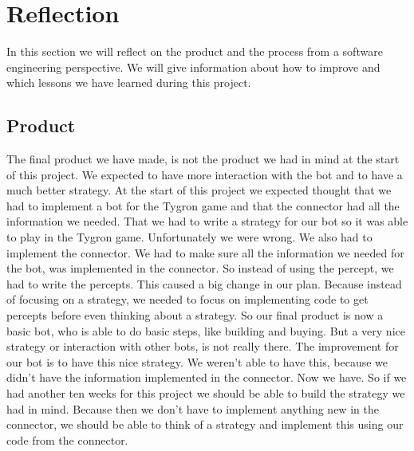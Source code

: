 \section{Reflection}
In this section we will reflect on the product and the process from a software engineering perspective. We will give information about how to improve and which lessons we have learned during this project.
\subsection{Product}
The final product we have made, is not the product we had in mind at the start of this project. We expected to have more interaction with the bot and to have a much better strategy. At the start of this project we expected thought that we had to implement a bot for the Tygron game and that the connector had all the information we needed. That we had to write a strategy for our bot so it was able to play in the Tygron game. Unfortunately we were wrong. We also had to implement the connector. We had to make sure all the information we needed for the bot, was implemented in the connector. So instead of using the percept, we had to write the percepts. This caused a big change in our plan. Because instead of focusing on a strategy, we needed to focus on implementing code to get percepts before even thinking about a strategy. So our final product is now a basic bot, who is able to do basic steps, like building and buying. But a very nice strategy or interaction with other bots, is not really there. The improvement for our bot is to have this nice strategy. We weren't able to have this, because we didn't have the information implemented in the connector. Now we have. So if we had another ten weeks for this project we should be able to build the strategy we had in mind. Because then we don't have to implement anything new in the connector, we should be able to think of a strategy and implement this using our code from the connector.

